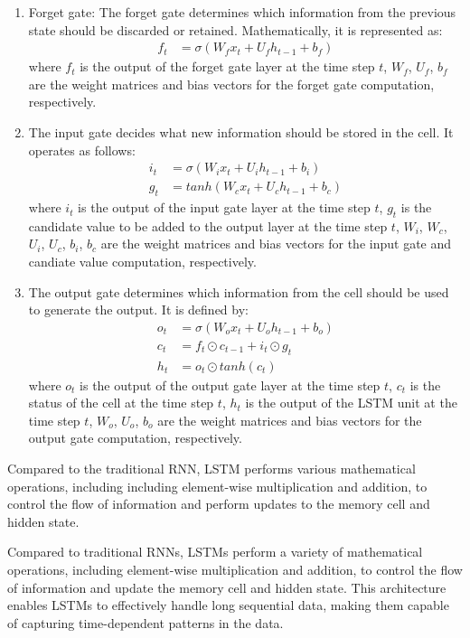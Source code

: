 \begin{enumerate}
	\item Forget gate:	The forget gate determines which information from the previous state should be discarded or retained. Mathematically, it is represented as:
	\begin{align}
		f_{t} &= \sigma(W_{f}x_{t} + U_{f}h_{t-1} + b_{f})
	\end{align}
	where $f_{t}$ is the output of the forget gate layer at the time step $t$, $W_{f}$, $U_{f}$, $b_{f}$ are the weight matrices and bias vectors for the forget gate computation, respectively.

	\item The input gate decides what new information should be stored in the cell. It operates as follows:
	\begin{align}
		i_{t} &= \sigma(W_{i}x_{t} + U_{i}h_{t-1} + b_{i}) \\
		g_{t} &= tanh(W_{c}x_{t} + U_{c}h_{t-1} + b_{c}) 
	\end{align}
	where $i_{t}$ is the output of the input gate layer at the time step $t$, $g_{t}$ is the candidate value to be added to the output layer at the time step $t$, $W_{i}$, $W_{c}$, $U_{i}$, $U_{c}$, $b_{i}$, $b_{c}$ are the weight matrices and bias vectors for the input gate and candiate value computation, respectively.
	
	\item The output gate determines which information from the cell should be used to generate the output. It is defined by:
	\begin{align}
		o_{t} &= \sigma(W_{o}x_{t} + U_{o}h_{t-1} + b_{o}) \\
		c_{t} &= f_{t} \odot c_{t-1} + i_{t} \odot g_{t} \\
		h_{t} &= o_{t} \odot tanh(c_{t})
	\end{align}
	where $o_{t}$ is the output of the output gate layer at the time step $t$, $c_{t}$ is the status of the cell at the time step $t$, $h_{t}$ is the output of the LSTM unit at the time step $t$, $W_{o}$, $U_{o}$, $b_{o}$ are the weight matrices and bias vectors for the output gate computation, respectively.
\end{enumerate}
Compared to the traditional RNN, LSTM performs various mathematical operations, including including element-wise multiplication and addition, to control the flow of information and perform updates to the memory cell and hidden state.

Compared to traditional RNNs, LSTMs perform a variety of mathematical operations, including element-wise multiplication and addition, to control the flow of information and update the memory cell and hidden state. 
This architecture enables LSTMs to effectively handle long sequential data, making them capable of capturing time-dependent patterns in the data.

